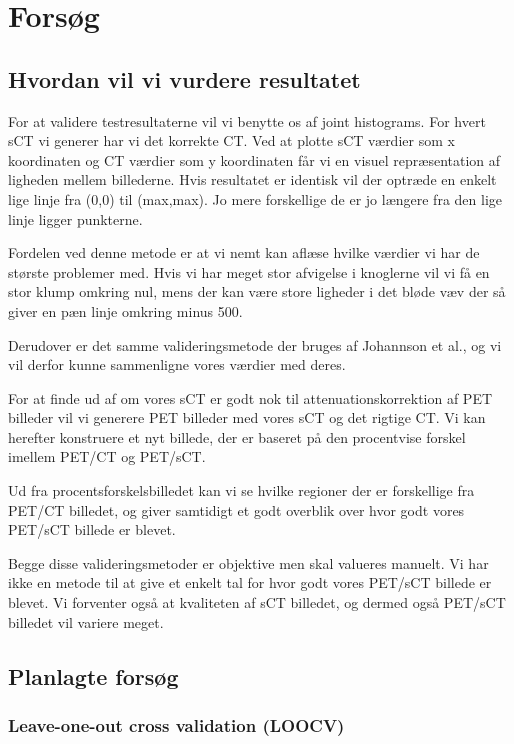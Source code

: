 \section{Forsøg}

\subsection{Hvordan vil vi vurdere resultatet}

For at validere testresultaterne vil vi benytte os af joint histograms. For hvert sCT vi generer har vi det korrekte CT. Ved at plotte sCT værdier som x koordinaten og CT værdier som y koordinaten får vi en visuel repræsentation af ligheden mellem billederne. Hvis resultatet er identisk vil der optræde en enkelt lige linje fra (0,0) til (max,max). Jo mere forskellige de er jo længere fra den lige linje ligger punkterne.

Fordelen ved denne metode er at vi nemt kan aflæse hvilke værdier vi har de største problemer med. Hvis vi har meget stor afvigelse i knoglerne vil vi få en stor klump omkring nul, mens der kan være store ligheder i det bløde væv der så giver en pæn linje omkring minus 500.

Derudover er det samme valideringsmetode der bruges af Johannson et al., og vi vil derfor kunne sammenligne vores værdier med deres.

For at finde ud af om vores sCT er godt nok til attenuationskorrektion af PET billeder vil vi generere PET billeder med vores sCT og det rigtige CT. Vi kan herefter konstruere et nyt billede, der er baseret på den procentvise forskel imellem PET/CT og PET/sCT. 

Ud fra procentsforskelsbilledet kan vi se hvilke regioner der er forskellige fra PET/CT billedet, og giver samtidigt et godt overblik over hvor godt vores PET/sCT billede er blevet.

Begge disse valideringsmetoder er objektive men skal valueres manuelt. Vi har ikke en metode til at give et enkelt tal for hvor godt vores PET/sCT billede er blevet. Vi forventer også at kvaliteten af sCT billedet, og dermed også PET/sCT billedet vil variere meget.


\subsection{Planlagte forsøg}

\subsubsection{Leave-one-out cross validation (LOOCV)}
